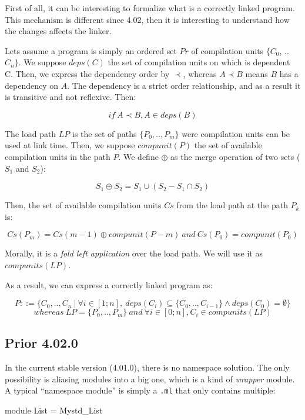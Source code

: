 \documentclass[11pt,a4paper]{article}
\begin{document}
First of all, it can be interesting to formalize what is a correctly linked
program. This mechanism is different since 4.02, then it is interesting to
understand how the changes affects the linker.

Lets assume a program is simply an ordered set $Pr$ of compilation units $\{C_0$,
.. $C_n\}$. We suppose $deps(C)$ the set of compilation units on which is
dependent C. Then, we express the dependency order by $\prec$, whereas $A \prec
B$ means $B$ has a dependency on $A$. The dependency is a strict order
relationship, and as a result it is transitive and not reflexive. Then:

$$if~ A \prec B, A \in deps(B)$$

The load path $LP$ is the set of paths $\{P_0, .., P_m\}$ were compilation units
can be used at link time. Then, we suppose $compunit(P)$ the set of available
compilation units in the path $P$. We define $\oplus$ as the merge operation of
two sets ($S_1$ and $S_2$):

$$S_1 \oplus S_2 = S_1 \cup (S_2 - S_1 \cap S_2) $$

Then, the set of available compilation units $Cs$ from the load path at the path
$P_k$ is: 

$$Cs(P_m) = Cs(m-1) \oplus compunit(P-m) ~and~ Cs(P_0) = compunit(P_0)$$

Morally, it is a \emph{fold left application} over the load path. We will use it
as $compunits(LP)$.

As a result, we can express a correctly linked program as:

$$ P ::= \{ C_0, .., C_n ~|~ \forall i \in [1; n], ~deps(C_i) \subseteq \{ C_0, ..,
    C_{i-1} \} \land deps(C_0) = \emptyset \}$$
$$  whereas ~ LP = \{ P_0, .., P_m \}~and~\forall i \in [0; n], C_i \in compunits(LP)
$$

\subsection{Prior 4.02.0}

In the current stable version (4.01.0), there is no namespace solution. The only
possibility is aliasing modules into a big one, which is a kind of
\emph{wrapper} module. A typical ``namespace module'' is simply a \texttt{.ml}
that only contains multiple:

\begin{OCaml}
module List = Mystd_List
\end{OCaml}
\end{document}
